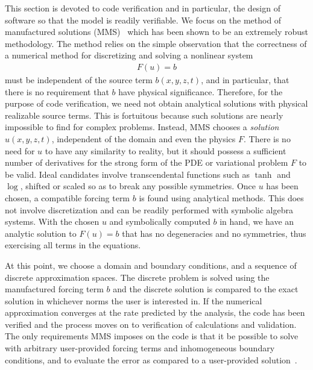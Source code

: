 This section is devoted to code verification and in particular, the design of software so that the model is readily verifiable.
We focus on the method of manufactured solutions (MMS)~\cite{roache2002cvm} which has been shown to be an extremely robust methodology.
The method relies on the simple observation that the correctness of a numerical method for discretizing and solving a nonlinear system
\begin{align*}
  F(u) = b
\end{align*}
must be independent of the source term $b(x,y,z,t)$, and in particular, that there is no requirement that $b$ have physical significance.
Therefore, for the purpose of code verification, we need not obtain analytical solutions with physical realizable source terms.
This is fortuitous because such solutions are nearly impossible to find for complex problems.
Instead, MMS chooses a \emph{solution} $u(x,y,z,t)$, independent of the domain and even the physics $F$.
There is no need for $u$ to have any similarity to reality, but it should possess a sufficient number of derivatives for the strong form of the PDE or variational problem $F$ to be valid.
Ideal candidates involve transcendental functions such as $\tanh$ and $\log$, shifted or scaled so as to break any possible symmetries.
Once $u$ has been chosen, a compatible forcing term $b$ is found using analytical methods.
This does not involve discretization and can be readily performed with symbolic algebra systems.
With the chosen $u$ and symbolically computed $b$ in hand, we have an analytic solution to $F(u) = b$ that has no degeneracies and no symmetries, thus exercising all terms in the equations.

At this point, we choose a domain and boundary conditions, and a sequence of discrete approximation spaces.
The discrete problem is solved using the manufactured forcing term $b$ and the discrete solution is compared to the exact solution in whichever norms the user is interested in.
If the numerical approximation converges at the rate predicted by the analysis, the code has been verified and the process moves on to verification of calculations and validation.
The only requirements MMS imposes on the code is that it be possible to solve with arbitrary user-provided forcing terms and inhomogeneous boundary conditions, and to evaluate the error as compared to a user-provided solution~\cite{roache2004bpc}.

